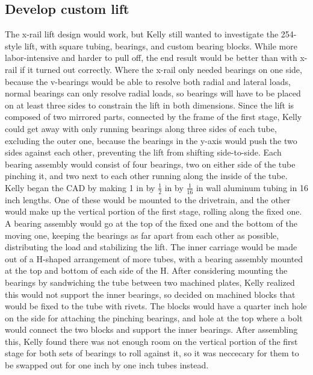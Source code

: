\documentclass{article}
\begin{document}
\subsection{Develop custom lift}
The x-rail lift design would work, but Kelly still wanted to investigate the 254-style lift, with square tubing, bearings, and custom bearing blocks. While more labor-intensive and harder to pull off, the end result would be better than with x-rail if it turned out correctly. Where the x-rail only needed bearings on one side, because the v-bearings would be able to resolve both radial and lateral loads, normal bearings can only resolve radial loads, so bearings will have to be placed on at least three sides to constrain the lift in both dimensions. Since the lift is composed of two mirrored parts, connected by the frame of the first stage, Kelly could get away with only running bearings along three sides of each tube, excluding the outer one, because the bearings in the y-axis would push the two sides against each other, preventing the lift from shifting side-to-side. Each bearing assembly would consist of four bearings, two on either side of the tube pinching it, and two next to each other running along the inside of the tube. Kelly began the CAD by making 1 in by $\frac{1}{2}$ in by $\frac{1}{16}$ in wall aluminum tubing in 16 inch lengths. One of these would be mounted to the drivetrain, and the other would make up the vertical portion of the first stage, rolling along the fixed one. A bearing assembly would go at the top of the fixed one and the bottom of the moving one, keeping the bearings as far apart from each other as possible, distributing the load and stabilizing the lift. The inner carriage would be made out of a H-shaped arrangement of more tubes, with a bearing assembly mounted at the top and bottom of each side of the H. After considering mounting the bearings by sandwiching the tube between two machined plates, Kelly realized this would not support the inner bearings, so decided on machined blocks that would be fixed to the tube with rivets. The blocks would have a quarter inch hole on the side for attaching the pinching bearings, and hole at the top where a bolt would connect the two blocks and support the inner bearings. After assembling this, Kelly found there was not enough room on the vertical portion of the first stage for both sets of bearings to roll against it, so it was neccecary for them to be swapped out for one inch by one inch tubes instead. 
\end{document}
